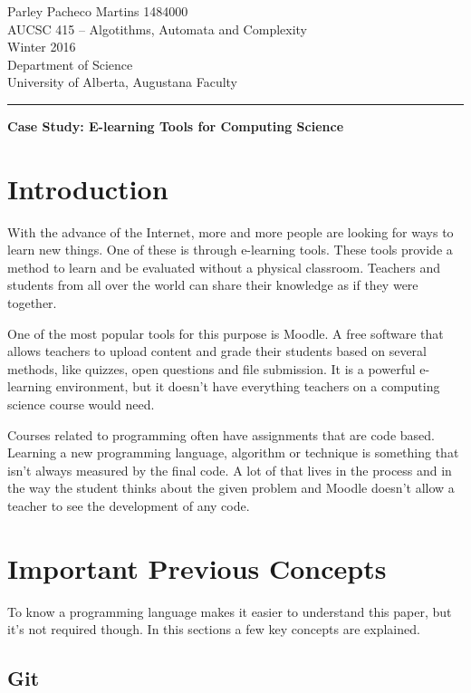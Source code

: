\documentclass[12pt]{article}
\begin{document}
\noindent
Parley Pacheco Martins 1484000\\
AUCSC 415 -- Algotithms, Automata and Complexity\\
Winter 2016\\
Department of Science\\
University of Alberta, Augustana Faculty

\vspace*{0.75\baselineskip}
\hrule
\vspace*{0.75\baselineskip}

\noindent
{\Large\bf Case Study: E-learning Tools for Computing Science}

\section{Introduction}

With the advance of the Internet, more and more people are looking for ways to learn new things. One of these is through e-learning tools. These tools provide a method to learn and be evaluated without a physical classroom. Teachers and students from all over the world can share their knowledge as if they were together.

One of the most popular tools for this purpose is Moodle. A free software that allows teachers to upload content and grade their students based on several methods, like quizzes, open questions and file submission. It is a powerful e-learning environment, but it doesn't have everything teachers on a computing science course would need.

Courses related to programming often have assignments that are code based. Learning a new programming language, algorithm or technique is something that isn't always measured by the final code. A lot of that lives in the process and in the way the student thinks about the given problem and Moodle doesn't allow a teacher to see the development of any code.


\section{Important Previous Concepts}

To know a programming language makes it easier to understand this paper, but it's not required though. In this sections a few key concepts are explained.

\subsection{Git}
\end{document}
